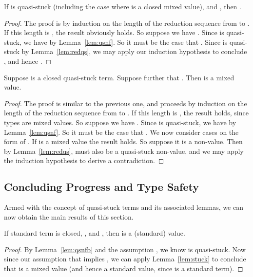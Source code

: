 \documentclass{LMCS}
\begin{document}
\begin{lem}
\label{lem:cac}
If  is quasi-stuck (including the case where  is a
closed mixed value), and , then .
\end{lem}
\begin{proof}  The proof is by induction on the length of
the reduction sequence from  to .  If this length is , the
result obviously holds.  So suppose we have .  Since  is quasi-stuck, we have  by
Lemma~\ref{lem:qsnf}.  So it must be the case that .  Since
 is quasi-stuck by Lemma~\ref{lem:redqs}, we may apply our
induction hypothesis to conclude , and hence .
\end{proof}

\begin{lem}
\label{lem:stuck}
Suppose  is a closed quasi-stuck term.  Suppose further that .
Then  is a mixed value.
\end{lem}
\begin{proof} The proof is similar to the previous one,
and proceeds by induction on the length of the reduction sequence from
 to .  If this length is , the result holds, since types are
mixed values.  So suppose we have .  Since
 is quasi-stuck, we have  by Lemma~\ref{lem:qsnf}.  So
it must be the case that .  We now consider cases on the
form of .  If  is a mixed value the result holds.  So suppose it
is a non-value.  Then by Lemma~\ref{lem:redqs},  must also be a
quasi-stuck non-value, and we may apply the induction hypothesis to
derive a contradiction. \end{proof}

\subsection{Concluding Progress and Type Safety}

Armed with the concept of quasi-stuck terms and its associated lemmas,
we can now obtain the main results of this section.

\begin{thm}[Progress]
\label{thm:progstlc}
If standard term  is closed, , and , then
 is a (standard) value.
\end{thm}

\begin{proof} By Lemma~\ref{lem:qsnfb} and the assumption , we know  is quasi-stuck.
Now since our assumption that  implies ,
we can apply Lemma~\ref{lem:stuck} to conclude that  is a mixed
value (and hence a standard value, since  is a standard term).  
\end{proof}
\end{document}
